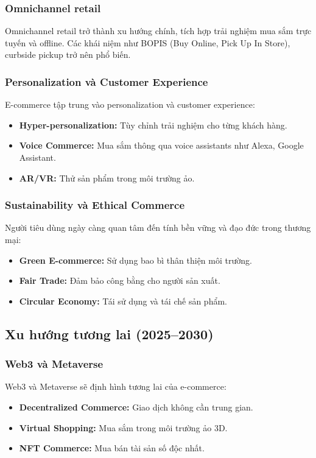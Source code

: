 \documentclass[a4paper,12pt]{report}
\begin{document}
\subsubsection{Omnichannel retail}
Omnichannel retail trở thành xu hướng chính, tích hợp trải nghiệm mua sắm trực tuyến và offline. Các khái niệm như BOPIS (Buy Online, Pick Up In Store), curbside pickup trở nên phổ biến.

\subsubsection{Personalization và Customer Experience}
E-commerce tập trung vào personalization và customer experience:
\begin{itemize}
    \item \textbf{Hyper-personalization:} Tùy chỉnh trải nghiệm cho từng khách hàng.
    \item \textbf{Voice Commerce:} Mua sắm thông qua voice assistants như Alexa, Google Assistant.
    \item \textbf{AR/VR:} Thử sản phẩm trong môi trường ảo.
\end{itemize}

\subsubsection{Sustainability và Ethical Commerce}
Người tiêu dùng ngày càng quan tâm đến tính bền vững và đạo đức trong thương mại:
\begin{itemize}
    \item \textbf{Green E-commerce:} Sử dụng bao bì thân thiện môi trường.
    \item \textbf{Fair Trade:} Đảm bảo công bằng cho người sản xuất.
    \item \textbf{Circular Economy:} Tái sử dụng và tái chế sản phẩm.
\end{itemize}

\subsection{Xu hướng tương lai (2025--2030)}

\subsubsection{Web3 và Metaverse}
Web3 và Metaverse sẽ định hình tương lai của e-commerce:
\begin{itemize}
    \item \textbf{Decentralized Commerce:} Giao dịch không cần trung gian.
    \item \textbf{Virtual Shopping:} Mua sắm trong môi trường ảo 3D.
    \item \textbf{NFT Commerce:} Mua bán tài sản số độc nhất.
\end{itemize}
\end{document}
